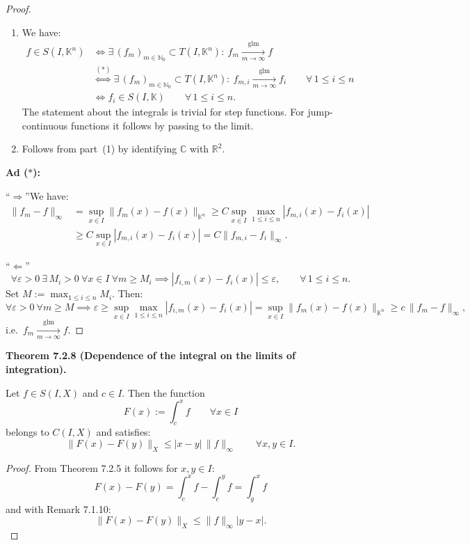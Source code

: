 \documentclass[12pt]{article}
\newenvironment{satz}[1]{%
  \par\vspace{6pt}\noindent\textbf{Theorem #1.}\itshape\space
}{%
  \par\vspace{6pt}
}
\begin{document}
\begin{proof}
\begin{enumerate}
    \item We have:
    \begin{align*}
    f\in S(I,\mathbb K^n)
    &\iff \exists\,(f_m)_{m\in\mathbb N_0}\subset T(I,\mathbb K^n):\ f_m\xrightarrow[m\to\infty]{\mathrm{glm}} f\\
    &\overset{(*)}{\iff} \exists\,(f_m)_{m\in\mathbb N_0}\subset T(I,\mathbb K^n):\ f_{m,i}\xrightarrow[m\to\infty]{\mathrm{glm}} f_i\qquad\forall\,1\le i\le n\\
    &\iff f_i\in S(I,\mathbb K)\qquad\forall\,1\le i\le n.
    \end{align*}
    The statement about the integrals is trivial for step functions. For jump-continuous functions it follows by passing to the limit.

    \item Follows from part~(1) by identifying $\mathbb C$ with $\mathbb R^2$.
\end{enumerate}

\medskip
\noindent\textbf{Ad ($*$):}

\noindent``$\Longrightarrow$''\quad We have:
\begin{align*}
\|f_m-f\|_\infty
&=\sup_{x\in I}\|f_m(x)-f(x)\|_{\mathbb K^n}
\ge C\sup_{x\in I}\max_{1\le i\le n}|f_{m,i}(x)-f_i(x)|\\
&\ge C\sup_{x\in I}|f_{m,i}(x)-f_i(x)|
=C\|f_{m,i}-f_i\|_\infty.
\end{align*}

\noindent``$\Longleftarrow$''\quad
\[
\forall\varepsilon>0\ \exists\,M_i>0\ \forall x\in I\ \forall m\ge M_i
\implies |f_{i,m}(x)-f_i(x)|\le\varepsilon,
\qquad\forall\,1\le i\le n.
\]
Set $M:=\max_{1\le i\le n}M_i$. Then:
\[
\forall\varepsilon>0\ \forall m\ge M
\implies \varepsilon\ge\sup_{x\in I}\max_{1\le i\le n}|f_{i,m}(x)-f_i(x)|
=\sup_{x\in I}\|f_m(x)-f(x)\|_{\mathbb K^n}
\ge c\,\|f_m-f\|_\infty,
\]
i.e.\ $f_m\xrightarrow[m\to\infty]{\mathrm{glm}} f$.
\end{proof}

\begin{satz}{7.2.8 (Dependence of the integral on the limits of integration)}
Let $f\in S(I,X)$ and $c\in I$. Then the function
\[
F(x):=\int_c^x f\qquad\forall x\in I
\]
belongs to $C(I,X)$ and satisfies:
\[
\|F(x)-F(y)\|_X\le|x-y|\,\|f\|_\infty
\qquad\forall x,y\in I.
\]
\end{satz}

\begin{proof}
From Theorem 7.2.5 it follows for $x,y\in I$:
\[
F(x)-F(y)=\int_c^x f-\int_c^y f=\int_y^x f
\]
and with Remark 7.1.10:
\[
\|F(x)-F(y)\|_X\le\|f\|_\infty|y-x|.
\]
\end{proof}
\end{document}
